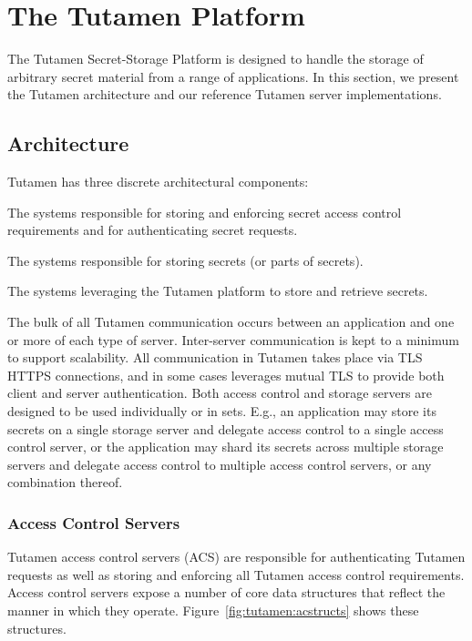 \section{The Tutamen Platform}
\label{sec:tutamen}

The Tutamen Secret-Storage Platform is designed to handle the storage
of arbitrary secret material from a range of applications. In this
section, we present the Tutamen architecture and our reference Tutamen
server implementations.

\subsection{Architecture}
\label{sec:tutamen:arch}

Tutamen has three discrete architectural components:

\begin{packed_desc}
\item[Access Control Servers (ACS):] The systems responsible for
  storing and enforcing secret access control requirements and for
  authenticating secret requests.
\item[Storage Servers (SS):] The systems responsible for storing
  secrets (or parts of secrets).
\item[Applications:] The systems leveraging the Tutamen platform to
  store and retrieve secrets.
\end{packed_desc}

The bulk of all Tutamen communication occurs between an application
and one or more of each type of server. Inter-server communication is
kept to a minimum to support scalability. All communication in Tutamen
takes place via TLS~\cite{dierks2008} HTTPS connections, and in some
cases leverages mutual TLS to provide both client and server
authentication. Both access control and storage servers are designed
to be used individually or in sets. E.g., an application may store its
secrets on a single storage server and delegate access control to a
single access control server, or the application may shard its secrets
across multiple storage servers and delegate access control to
multiple access control servers, or any combination thereof.

\subsubsection{Access Control Servers}
\label{sec:tutamen:arch:acs}

Tutamen access control servers (ACS) are responsible for
authenticating Tutamen requests as well as storing and enforcing all
Tutamen access control requirements. Access control servers expose a
number of core data structures that reflect the manner in which they
operate. Figure~\ref{fig:tutamen:acstructs} shows these structures.

